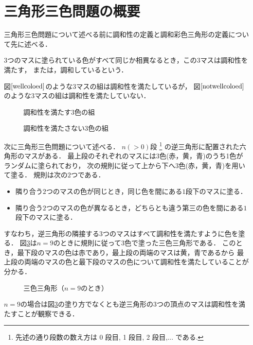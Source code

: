 \section{三角形三色問題の概要}
三角形三色問題について述べる前に調和性の定義と調和彩色三角形の定義について先に述べる．
\begin{dfn}[調和性] \label{dfn:wc}
  $3$つのマスに塗られている色がすべて同じか相異なるとき，この$3$マスは調和性を満たす，
  または，調和しているという．
\end{dfn}

\begin{exm}
  図$\ref{wellcoloed}$のような$3$マスの組は調和性を満たしているが，
  図$\ref{notwellcoloed}$のような$3$マスの組は調和性を満たしていない．
  \begin{figure}[h]
    \centering
    
    \caption{調和性を満たす$3$色の組}
    \label{wellcoloed}
  \end{figure}
  \begin{figure}[h]
    \centering
    
    \caption{調和性を満たさない$3$色の組}
    \label{notwellcoloed}
  \end{figure}
\end{exm}

次に三角形三色問題について述べる．
$n(>0)$段
\footnote{
  先述の通り段数の数え方は 0 段目, 1 段目, 2 段目,... である.
  }
の逆三角形に配置された六角形のマスがある．
最上段のそれぞれのマスには$3$色(赤，黄，青)のうち1色がランダムに塗られており，
次の規則に従って上から下へ$3$色(赤，黄，青)を用いて塗る．
規則は次の$2$つである．
\begin{itemize}
  \item
    隣り合う$2$つのマスの色が同じとき，同じ色を間にある$1$段下のマスに塗る．
  \item
    隣り合う$2$つのマスの色が異なるとき，どちらとも違う第三の色を間にある$1$段下のマスに塗る．
\end{itemize}
すなわち，逆三角形の隣接する$3$つのマスはすべて調和性を満たすように色を塗る．
図\ref{fig:nine_steps}は$n=9$のときに規則に従って3色で塗った三色三角形である．
このとき，最下段のマスの色は赤であり，最上段の両端のマスは黄，青であるから
最上段の両端のマスの色と最下段のマスの色について調和性を満たしていることが分かる．
\begin{figure}[h]
    \centering
    
    \caption{三色三角形（$n=9$のとき）}
    \label{fig:nine_steps}
\end{figure}
$n=9$の場合は図\ref{fig:nine_steps}の塗り方でなくとも逆三角形の$3$つの頂点のマスは調和性を満たすことが観察できる．

